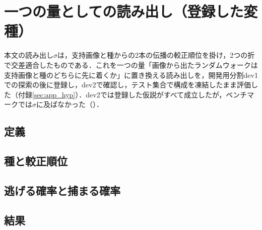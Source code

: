 \newcommand\TFaces{命題A1}
\newcommand\TLimits{定理A1}
\newcommand\TValid{定理A2}
\newcommand\TEscape{定理A3}
\newcommand\TCapture{定理A4}
\newcommand\CSep{系A1}
\section{一つの量としての読み出し（登録した変種）}
\label{sec:app_h16}
本文の読み出し$\sigma$は，支持画像と種からの2本の伝播の較正順位を掛け，2つの折で交差適合したものである．これを一つの量「画像から出たランダムウォークは支持画像と種のどちらに先に着くか」に置き換える読み出しを，開発用分割dev1での探索の後に登録し，dev2で確認し，テスト集合で構成を凍結したまま評価した（付録\ref{sec:app_hyp}）．dev2では登録した仮説がすべて成立したが，ベンチマークでは$\sigma$に及ばなかった（）．

\subsection{定義}
\label{sec:h19def}



\subsection{種と較正順位}
\label{sec:seed19}


\subsection{逃げる確率と捕まる確率}
\label{sec:sep19}


\subsection{結果}
\label{sec:app_h16res}

